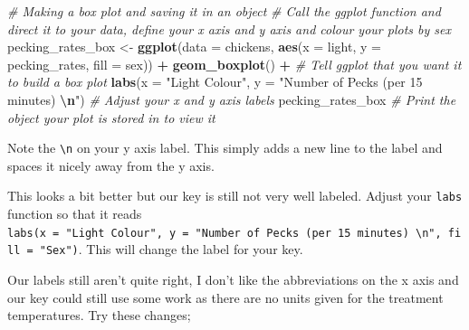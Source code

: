 \documentclass[
]{book}
\newenvironment{Shaded}{\begin{snugshade}}{\end{snugshade}}
\newcommand{\AttributeTok}[1]{\textcolor[rgb]{0.13,0.29,0.53}{#1}}
\newcommand{\CommentTok}[1]{\textcolor[rgb]{0.56,0.35,0.01}{\textit{#1}}}
\newcommand{\FunctionTok}[1]{\textcolor[rgb]{0.13,0.29,0.53}{\textbf{#1}}}
\newcommand{\NormalTok}[1]{#1}
\newcommand{\OtherTok}[1]{\textcolor[rgb]{0.56,0.35,0.01}{#1}}
\newcommand{\SpecialCharTok}[1]{\textcolor[rgb]{0.81,0.36,0.00}{\textbf{#1}}}
\newcommand{\StringTok}[1]{\textcolor[rgb]{0.31,0.60,0.02}{#1}}
\begin{document}
\begin{Shaded}
\begin{Highlighting}[]
\CommentTok{\# Making a box plot and saving it in an object}
\CommentTok{\# Call the ggplot function and direct it to your data, define your x axis and y axis and colour your plots by sex}
\NormalTok{pecking\_rates\_box }\OtherTok{\textless{}{-}} \FunctionTok{ggplot}\NormalTok{(}\AttributeTok{data =}\NormalTok{ chickens, }\FunctionTok{aes}\NormalTok{(}\AttributeTok{x =}\NormalTok{ light, }\AttributeTok{y =}\NormalTok{ pecking\_rates, }\AttributeTok{fill =}\NormalTok{ sex)) }\SpecialCharTok{+}
  \FunctionTok{geom\_boxplot}\NormalTok{() }\SpecialCharTok{+} \CommentTok{\# Tell ggplot that you want it to build a box plot}
  \FunctionTok{labs}\NormalTok{(}\AttributeTok{x =} \StringTok{"Light Colour"}\NormalTok{, }\AttributeTok{y =} \StringTok{"Number of Pecks (per 15 minutes) }\SpecialCharTok{\textbackslash{}n}\StringTok{"}\NormalTok{) }\CommentTok{\# Adjust your x and y axis labels}
\NormalTok{pecking\_rates\_box }\CommentTok{\# Print the object your plot is stored in to view it}
\end{Highlighting}
\end{Shaded}

Note the \texttt{\textbackslash{}n} on your y axis label. This simply adds a new line to the label and spaces it nicely away from the y axis.

This looks a bit better but our key is still not very well labeled. Adjust your \texttt{labs} function so that it reads \texttt{labs(x\ =\ "Light\ Colour",\ y\ =\ "Number\ of\ Pecks\ (per\ 15\ minutes)\ \textbackslash{}n",\ fill\ =\ "Sex")}. This will change the label for your key.

Our labels still aren't quite right, I don't like the abbreviations on the x axis and our key could still use some work as there are no units given for the treatment temperatures. Try these changes;
\end{document}
